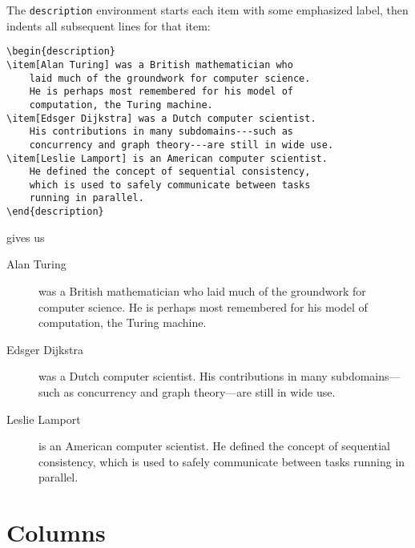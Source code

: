 \bigskip
\noindent The \texttt{description} environment starts each item with some
emphasized label,
then indents all subsequent lines for that item:
\begin{leftfigure}
\begin{lstlisting}
\begin{description}
\item[Alan Turing] was a British mathematician who
    laid much of the groundwork for computer science.
    He is perhaps most remembered for his model of
    computation, the Turing machine.
\item[Edsger Dijkstra] was a Dutch computer scientist.
    His contributions in many subdomains---such as
    concurrency and graph theory---are still in wide use.
\item[Leslie Lamport] is an American computer scientist.
    He defined the concept of sequential consistency,
    which is used to safely communicate between tasks
    running in parallel.
\end{description}
\end{lstlisting}
\end{leftfigure}
gives us
\begin{leftfigure}
\lm%
\begin{description}
\item[\lm Alan Turing] was a British mathematician who
    laid much of the groundwork for computer science.
    He is perhaps most remembered for his model of computation,
    the Turing machine.
\item[\lm Edsger Dijkstra] was a Dutch computer scientist.
    His contributions in many subdomains---such as
    concurrency and graph theory---are still in wide use.
\item[\lm Leslie Lamport] is an American computer scientist.
    He defined the concept of sequential consistency,
    which is used to safely communicate between tasks
    running in parallel.
\end{description}
\end{leftfigure}

\section{Columns}

